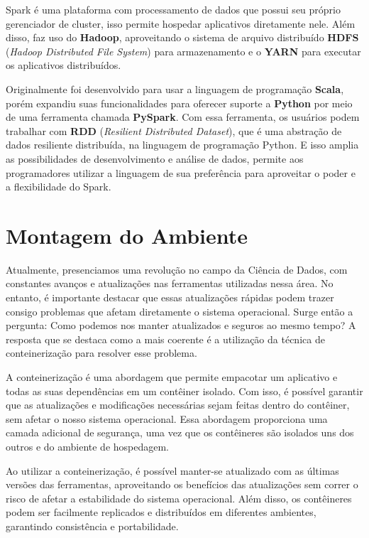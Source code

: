 Spark é uma plataforma com processamento de dados que possui seu próprio gerenciador de cluster, isso permite hospedar aplicativos diretamente nele. Além disso, faz uso do \textbf{Hadoop}, aproveitando o sistema de arquivo distribuído \textbf{HDFS} (\textit{Hadoop Distributed File System}) para armazenamento e o \textbf{YARN} para executar os aplicativos distribuídos.

Originalmente foi desenvolvido para usar a linguagem de programação \textbf{Scala}, porém expandiu suas funcionalidades para oferecer suporte a \textbf{Python} por meio de uma ferramenta chamada \textbf{PySpark}. Com essa ferramenta, os usuários podem trabalhar com \textbf{RDD} (\textit{Resilient Distributed Dataset}), que é uma abstração de dados resiliente distribuída, na linguagem de programação Python. E isso amplia as possibilidades de desenvolvimento e análise de dados, permite aos programadores utilizar a linguagem de sua preferência para aproveitar o poder e a flexibilidade do Spark.

\section{Montagem do Ambiente}
Atualmente, presenciamos uma revolução no campo da Ciência de Dados, com constantes avanços e atualizações nas ferramentas utilizadas nessa área. No entanto, é importante destacar que essas atualizações rápidas podem trazer consigo problemas que afetam diretamente o sistema operacional. Surge então a pergunta: Como podemos nos manter atualizados e seguros ao mesmo tempo? A resposta que se destaca como a mais coerente é a utilização da técnica de conteinerização para resolver esse problema.

A conteinerização é uma abordagem que permite empacotar um aplicativo e todas as suas dependências em um contêiner isolado. Com isso, é possível garantir que as atualizações e modificações necessárias sejam feitas dentro do contêiner, sem afetar o nosso sistema operacional. Essa abordagem proporciona uma camada adicional de segurança, uma vez que os contêineres são isolados uns dos outros e do ambiente de hospedagem.

Ao utilizar a conteinerização, é possível manter-se atualizado com as últimas versões das ferramentas, aproveitando os benefícios das atualizações sem correr o risco de afetar a estabilidade do sistema operacional. Além disso, os contêineres podem ser facilmente replicados e distribuídos em diferentes ambientes, garantindo consistência e portabilidade.

